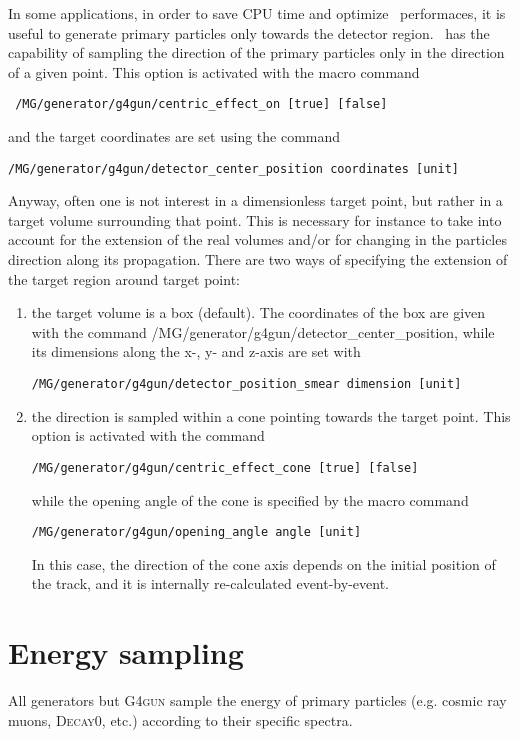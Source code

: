 In some applications, in order to save CPU time and optimize \mage \ performaces, it is useful to 
generate primary particles only towards the detector region. \mage \ has the
capability of sampling the direction of the primary particles only in the
direction of a given point.
This option is activated with the macro command
\begin{lstlisting}
 /MG/generator/g4gun/centric_effect_on [true] [false]
\end{lstlisting}
and the target coordinates are set using the command
\begin{lstlisting}
/MG/generator/g4gun/detector_center_position coordinates [unit]
\end{lstlisting}
Anyway, often one is not interest in a dimensionless target point, but rather in a target volume surrounding that 
point. This is necessary for instance to take into account for the extension of the real volumes and/or for changing in the 
particles direction along its propagation. There are two ways of specifying the extension of the target region 
around target point: 
\begin{enumerate}
\item the target volume is a box (default). The coordinates of the box are given with the command 
/MG/generator/g4gun/detector\_center\_position, while its dimensions along the x-, y- and z-axis are set with 
\begin{lstlisting}
/MG/generator/g4gun/detector_position_smear dimension [unit]
\end{lstlisting}
\item the direction is sampled within a cone pointing towards the target point. This option is activated 
with the command 
\begin{lstlisting}
/MG/generator/g4gun/centric_effect_cone [true] [false]
\end{lstlisting}
while the opening angle of the cone is specified by the macro command
\begin{lstlisting}
/MG/generator/g4gun/opening_angle angle [unit]
\end{lstlisting}
In this case, the direction of the cone axis depends on the initial position of the track, and it is internally 
re-calculated event-by-event.
\end{enumerate}    

\section{Energy sampling} \label{sec:energysampling}
All generators but  \textsc{G4gun} sample the energy of primary particles (e.g. cosmic ray muons, 
\textsc{Decay0}, etc.) according to their specific spectra. \\

